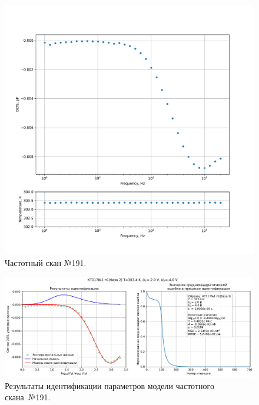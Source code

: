 \begin{figure}[!ht]
    \centering
    \includegraphics[width=1\textwidth]{../plots/КТ117№1_п1(база 2)_2500Гц-1Гц_1пФ_+30С_-2В-4В_100мВ_20мкс_шаг_0,1.pdf}
    \caption{Частотный скан №191.}
    \label{pic:frequency_scan_191}
\end{figure}

\begin{figure}[!ht]
    \centering
    \includegraphics[width=1\textwidth]{../plots/КТ117№1_п1(база 2)_2500Гц-1Гц_1пФ_+30С_-2В-4В_100мВ_20мкс_шаг_0,1_model.pdf}
    \caption{Результаты идентификации параметров модели частотного скана~№191.}
    \label{pic:frequency_scan_model191}
\end{figure}

\pagebreak


